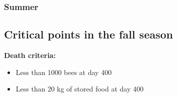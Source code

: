 \documentclass[
	paper=128mm:96mm,
	fontsize=11pt,
	pagesize,
	parskip=half-,
]{scrartcl}
\theoremstyle{mythmstyle} %
\begin{document}
\subsubsection*{Summer}
	\begin{figure}[H]
	\end{figure}
	\clearpage
\subsection*{Critical points in the fall season}
\textbf{Death criteria:}
	\begin{itemize}
		\item Less than 1000 bees at day 400
		\item Less than 20 kg of stored food at day 400
	\end{itemize}
	\clearpage
\end{document}
